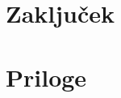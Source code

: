 \documentclass[12pt,a4paper]{amsart}
\theoremstyle{definition}
\theoremstyle{plain}
\begin{document}

\section{Zaključek}

\newpage
\section{Priloge}
\end{document}
